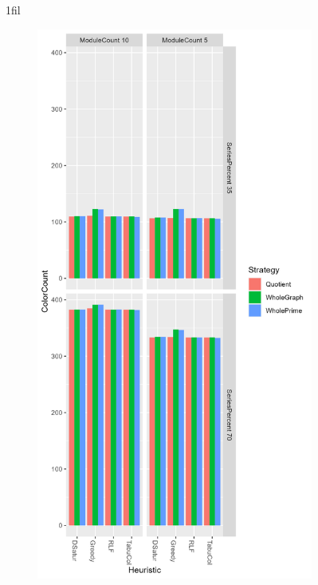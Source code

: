 \documentclass[a4paper]{article}
\makeatletter
\newcommand*{\centerfloat}{%
  \parindent \z@
  \leftskip \z@ \@plus 1fil \@minus \textwidth
  \rightskip\leftskip
  \parfillskip \z@skip}
\makeatother
\begin{document}
\newcommand{\figdesc}[0]{Graph coloring algorithm is on the x-axis, color/time is on the y-axis, staple colors represent the different strategies. }
\newcommand{\facfigdesc}[0]{\figdesc Result faceted by Module size and series probability. }

\newcommand{\resultbase}{0.3\paperwidth}

\begin{figure}[p]
\centerfloat
    \begin{subfigure}{\resultbase}
        \includegraphics[width=\columnwidth]{Tables/1000.png}

\end{subfigure}
\end{figure}
\end{document}
